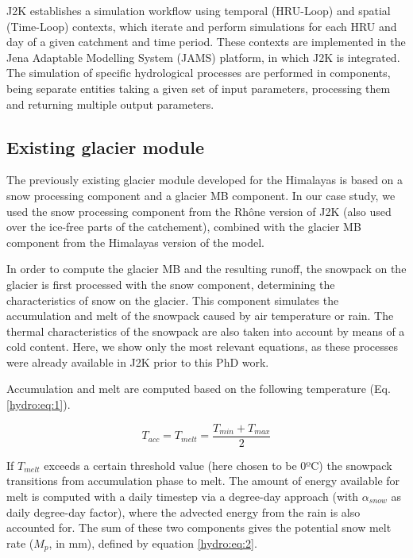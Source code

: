 J2K establishes a simulation workflow using temporal (HRU-Loop) and spatial (Time-Loop) contexts, which iterate and perform simulations for each HRU and day of a given catchment and time period. These contexts are implemented in the Jena Adaptable Modelling System (JAMS) platform, in which J2K is integrated. The simulation of specific hydrological processes are performed in components, being separate entities taking a given set of input parameters, processing them and returning multiple output parameters. 

\subsection{Existing glacier module}

The previously existing glacier module developed for the Himalayas is based on a snow processing component and a glacier MB component. In our case study, we used the snow processing component from the Rhône version of J2K (also used over the ice-free parts of the catchement), combined with the glacier MB component from the Himalayas version of the model.

In order to compute the glacier MB and the resulting runoff, the snowpack on the glacier is first processed with the snow component, determining the characteristics of snow on the glacier. This component simulates the accumulation and melt of the snowpack caused by air temperature or rain. The thermal characteristics of the snowpack are also taken into account by means of a cold content. Here, we show only the most relevant equations, as these processes were already available in J2K prior to this PhD work.

Accumulation and melt are computed based on the following temperature (Eq. \ref{hydro:eq:1}).

\begin{equation} \label{hydro:eq:1}
 T_{acc} = T_{melt} = \frac{T_{min} + T_{max}}{2}
\end{equation} 

If $T_{melt}$ exceeds a certain threshold value (here chosen to be 0ºC) the snowpack transitions from accumulation phase to melt. The amount of energy available for melt is computed with a daily timestep via a degree-day approach (with $\alpha_{snow}$ as daily degree-day factor), where the advected energy from the rain is also accounted for. The sum of these two components gives the potential snow melt rate ($M_{p}$, in mm), defined by equation \ref{hydro:eq:2}.

